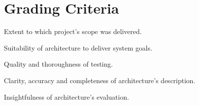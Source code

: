 \documentclass{csse4400}
\begin{document}
\section{Grading Criteria}

\begin{description}[itemsep=3pt]
    \item[20\%] Extent to which project's scope was delivered.
    \item[20\%] Suitability of architecture to deliver system goals.
    \item[20\%] Quality and thoroughness of testing.
    \item[20\%] Clarity, accuracy and completeness of architecture's description.
    \item[20\%] Insightfulness of architecture's evaluation.
\end{description}







\end{document}
